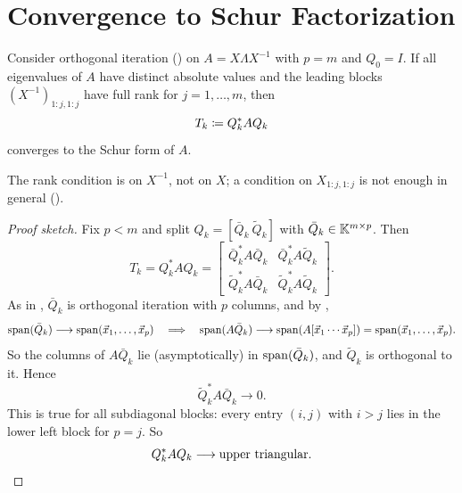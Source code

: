 \section{Convergence to Schur Factorization}
\label{sec:conv-schur}

\begin{theorem}
  \label{thm:orth-iter-schur}
  Consider orthogonal iteration () on $A = X\Lambda X^{-1}$ with $p = m$ and $Q_0 = I$. If all eigenvalues of $A$ have distinct absolute values and the leading blocks $(X^{-1})_{1:j,1:j}$ have full rank for $j = 1, \dots, m$, then
  \begin{equation}
    T_k \coloneqq Q_k^\ast AQ_k
  \end{equation}
  converges to the Schur form of $A$.
\end{theorem}

The rank condition is on $X^{-1}$, not on $X$; a condition on $X_{1:j,1:j}$ is not enough in general ().

\begin{proof}[Proof sketch]
  Fix $p < m$ and split $Q_k = [\bar{Q}_k\ \tilde{Q}_k]$ with $\bar{Q}_k \in \mathbb{K}^{m \times p}$. Then
  \begin{equation}
    T_k = Q_k^\ast AQ_k = \begin{bmatrix} \bar{Q}_k^\ast A\bar{Q}_k & \bar{Q}_k^\ast A\tilde{Q}_k \\ \tilde{Q}_k^\ast A\bar{Q}_k & \tilde{Q}_k^\ast A\tilde{Q}_k \end{bmatrix}.
  \end{equation}
  As in , $\bar{Q}_k$ is orthogonal iteration with $p$ columns, and by ,
  \begin{equation}
    \operatorname{span}(\bar{Q}_k) \longrightarrow \operatorname{span}(\vec{x}_1, \dots, \vec{x}_p)
    \quad\Longrightarrow\quad
    \operatorname{span}(A\bar{Q}_k) \longrightarrow \operatorname{span}(A[\vec{x}_1 \cdots \vec{x}_p]) = \operatorname{span}(\vec{x}_1, \dots, \vec{x}_p).
  \end{equation}
  So the columns of $A\bar{Q}_k$ lie (asymptotically) in $\operatorname{span}(\bar{Q}_k)$, and $\tilde{Q}_k$ is orthogonal to it. Hence
  \begin{equation}
    \tilde{Q}_k^\ast A\bar{Q}_k \longrightarrow 0.
  \end{equation}
  This is true for all subdiagonal blocks: every entry $(i, j)$ with $i > j$ lies in the lower left block for $p = j$. So
  \begin{equation}
    Q_k^\ast AQ_k \longrightarrow \text{upper triangular}. \qedhere
  \end{equation}
\end{proof}

